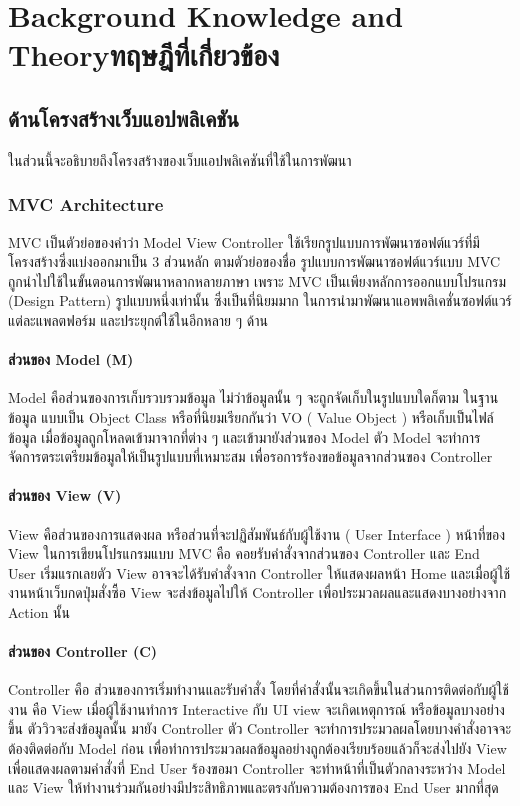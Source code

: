 \chapter{\ifenglish Background Knowledge and Theory\else ทฤษฎีที่เกี่ยวข้อง\fi}


\section{ด้านโครงสร้างเว็บแอปพลิเคชัน}
ในส่วนนี้จะอธิบายถึงโครงสร้างของเว็บแอปพลิเคชันที่ใช้ในการพัฒนา

\subsection{MVC Architecture}
MVC \cite{web:codebee} เป็นตัวย่อของคำว่า Model View Controller ใช้เรียกรูปแบบการพัฒนาซอฟต์แวร์ที่มีโครงสร้างซึ่งแบ่งออกมาเป็น 3 ส่วนหลัก ตามตัวย่อของชื่อ รูปแบบการพัฒนาซอฟต์แวร์แบบ MVC ถูกนำไปใช้ในขั้นตอนการพัฒนาหลากหลายภาษา
เพราะ MVC เป็นเพียงหลักการออกแบบโปรแกรม (Design Pattern) รูปแบบหนึ่งเท่านั้น ซึ่งเป็นที่นิยมมาก ในการนำมาพัฒนาแอพพลิเคชั่นซอฟต์แวร์แต่ละแพลตฟอร์ม และประยุกต์ใช้ในอีกหลาย ๆ ด้าน
\subsubsection{ส่วนของ Model (M)}
Model คือส่วนของการเก็บรวบรวมข้อมูล ไม่ว่าข้อมูลนั้น ๆ จะถูกจัดเก็บในรูปแบบใดก็ตาม ในฐานข้อมูล
แบบเป็น Object Class หรือที่นิยมเรียกกันว่า VO ( Value Object ) หรือเก็บเป็นไฟล์ข้อมูล
เมื่อข้อมูลถูกโหลดเข้ามาจากที่ต่าง ๆ และเข้ามายังส่วนของ Model ตัว Model จะทำการจัดการตระเตรียมข้อมูลให้เป็นรูปแบบที่เหมาะสม เพื่อรอการร้องขอข้อมูลจากส่วนของ Controller
\subsubsection{ส่วนของ View (V)}
View คือส่วนของการแสดงผล หรือส่วนที่จะปฏิสัมพันธ์กับผู้ใช้งาน ( User Interface ) หน้าที่ของ View
ในการเขียนโปรแกรมแบบ MVC คือ คอยรับคำสั่งจากส่วนของ Controller และ End User เริ่มแรกเลยตัว View
อาจจะได้รับคำสั่งจาก Controller ให้แสดงผลหน้า Home และเมื่อผู้ใช้งานหน้าเว็บกดปุ่มสั่งซื้อ View จะส่งข้อมูลไปให้ Controller เพื่อประมวลผลและแสดงบางอย่างจาก Action นั้น
\subsubsection{ส่วนของ Controller (C)}
Controller คือ ส่วนของการเริ่มทำงานและรับคำสั่ง โดยที่คำสั่งนั้นจะเกิดขึ้นในส่วนการติดต่อกับผู้ใช้งาน คือ View
เมื่อผู้ใช้งานทำการ Interactive กับ UI view จะเกิดเหตุการณ์ หรือข้อมูลบางอย่างขึ้น ตัววิวจะส่งข้อมูลนั้น
มายัง Controller ตัว Controller จะทำการประมวลผลโดยบางคำสั่งอาจจะต้องติดต่อกับ Model ก่อน
เพื่อทำการประมวลผลข้อมูลอย่างถูกต้องเรียบร้อยแล้วก็จะส่งไปยัง View เพื่อแสดงผลตามคำสั่งที่ End User ร้องขอมา
Controller จะทำหน้าที่เป็นตัวกลางระหว่าง Model และ View ให้ทำงานร่วมกันอย่างมีประสิทธิภาพและตรงกับความต้องการของ End User มากที่สุด

